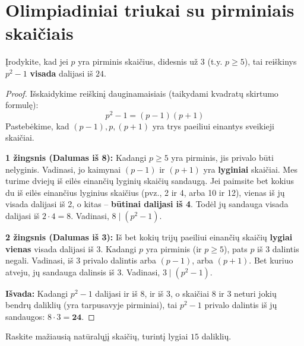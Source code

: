 \documentclass[11pt,a4paper]{scrartcl}
\begin{document}
\section{Olimpiadiniai triukai su pirminiais skaičiais}

\begin{example}
Įrodykite, kad jei $p$ yra pirminis skaičius, didesnis už $3$ (t.y. $p \ge 5$), tai reiškinys $p^2 - 1$ \textbf{visada} dalijasi iš $24$.
\end{example}

\begin{proof}

Išskaidykime reiškinį dauginamaisiais (taikydami kvadratų skirtumo formulę):
\[ p^2 - 1 = (p - 1)(p + 1) \]
Pastebėkime, kad $(p-1), p, (p+1)$ yra trys paeiliui einantys sveikieji skaičiai.

\textbf{1 žingsnis (Dalumas iš 8):}
Kadangi $p \ge 5$ yra pirminis, jis privalo būti nelyginis. Vadinasi, jo kaimynai $(p-1)$ ir $(p+1)$ yra \textbf{lyginiai} skaičiai. Mes turime dviejų iš eilės einančių lyginių skaičių sandaugą. Jei paimsite bet kokius du iš eilės einančius lyginius skaičius (pvz., 2 ir 4, arba 10 ir 12), vienas iš jų visada dalijasi iš 2, o kitas – \textbf{būtinai dalijasi iš 4}. Todėl jų sandauga visada dalijasi iš $2 \cdot 4 = 8$. Vadinasi, $8 \mid (p^2 - 1)$.

\textbf{2 žingsnis (Dalumas iš 3):}
Iš bet kokių trijų paeiliui einančių skaičių \textbf{lygiai vienas} visada dalijasi iš 3. Kadangi $p$ yra pirminis (ir $p \ge 5$), pats $p$ iš 3 dalintis negali. Vadinasi, iš 3 privalo dalintis arba $(p-1)$, arba $(p+1)$. Bet kuriuo atveju, jų sandauga dalinsis iš 3. Vadinasi, $3 \mid (p^2 - 1)$.

\textbf{Išvada:}
Kadangi $p^2 - 1$ dalijasi ir iš 8, ir iš 3, o skaičiai 8 ir 3 neturi jokių bendrų daliklių (yra tarpusavyje pirminiai), tai $p^2 - 1$ privalo dalintis iš jų sandaugos: $8 \cdot 3 = \mathbf{24}$. 
\end{proof}

\begin{example}
Raskite mažiausią natūralųjį skaičių, turintį lygiai $15$ daliklių.
\end{example}
\end{document}
